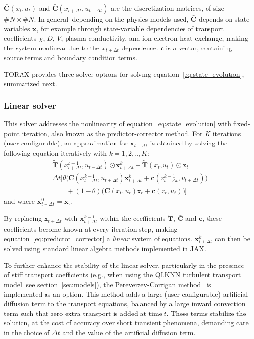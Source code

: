 \documentclass[aps, reprint, nofootinbib]{revtex4-2}
\begin{document}
$\mathbf{\bar{C}}(x_t, u_t)$ and $\mathbf{\bar{C}}(x_{t+\Delta t}, u_{t+\Delta t})$ are the discretization matrices, of size $\#N\times\#N$. In general, depending on the physics models used, $\mathbf{\bar{C}}$ depends on state variables $\mathbf{x}$, for example through state-variable dependencies of transport coefficients $\chi$, $D$, $V$, plasma conductivity, and ion-electron heat exchange, making the system nonlinear due to the $x_{t+\Delta t}$ dependence. $\mathbf{c}$ is a vector, containing source terms and boundary condition terms.

TORAX provides three solver options for solving equation~\ref{eq:state_evolution}, summarized next.

\subsubsection{Linear solver}
This solver addresses the nonlinearity of equation~\ref{eq:state_evolution} with fixed-point iteration, also known as the predictor-corrector method. For $K$ iterations (user-configurable), an approximation for $\mathbf{x}_{t+\Delta t}$ is obtained by solving the following equation iteratively with $k=1,2,..,K$:
\begin{equation}
\label{eq:predictor_corrector}
\begin{aligned}
& \mathbf{\tilde{T}}(x_{t + \Delta t}^{k-1}, u_{t + \Delta t})\odot\mathbf{x}_{t + \Delta t}^k - \mathbf{\tilde{T}}(x_t, u_t)\odot\mathbf{x}_t =  \\
& \Delta t \big[ \theta \big( \mathbf{\bar{C}}(x_{t+\Delta t}^{k-1}, u_{t+\Delta t})\mathbf{x}_{t+\Delta t}^k + \mathbf{c}(x_{t+\Delta t}^{k-1}, u_{t+\Delta t}) \big)  \\ 
& \qquad + (1-\theta) \big( \mathbf{\bar{C}}(x_t, u_t)\mathbf{x}_t + \mathbf{c}(x_{t}, u_{t}) \big) \big]
\end{aligned}
\end{equation}
and where $\mathbf{x}_{t+\Delta t}^{0} = \mathbf{x}_t$.

By replacing $\mathbf{x}_{t+\Delta t}$ with $\mathbf{x}_{t+\Delta t}^{k-1}$ within the coefficients $\mathbf{\tilde{T}}$, $\mathbf{\bar{C}}$ and $\mathbf{c}$, these coefficients become known at every iteration step, making equation~\ref{eq:predictor_corrector} a \textit{linear} system of equations. $\mathbf{x}_{t+\Delta t}^k$ can then be solved using standard linear algebra methods implemented in JAX.

To further enhance the stability of the linear solver, particularly in the presence of stiff transport coefficients (e.g., when using the QLKNN turbulent transport model, see section~\ref{sec:models}), the Pereverzev-Corrigan method~\cite{pereverzev:2008} is implemented as an option. This method adds a large (user-configurable) artificial diffusion term to the transport equations, balanced by a large inward convection term such that zero extra transport is added at time $t$. These terms stabilize the solution, at the cost of accuracy over short transient phenomena, demanding care in the choice of $\Delta t$ and the value of the artificial diffusion term.
\end{document}
